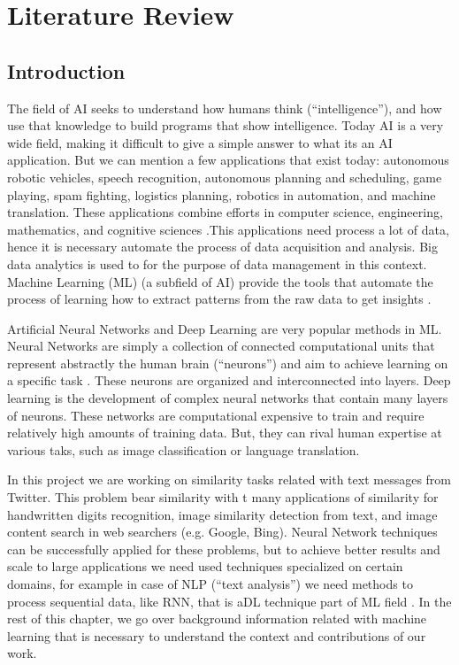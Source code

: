 \documentclass[12pt]{report}
\begin{document}
	\onehalfspacing
	
	\chapter{Literature Review} \label{chapter 2}
	\section{Introduction}
	
	The field of \ac{AI} seeks to understand how humans think (``intelligence''), and how use that knowledge to build programs that show intelligence. 
	Today \ac{AI} is a very wide field, making it difficult to give a simple answer to what its an AI application. But we can mention a few applications that exist today:  autonomous robotic vehicles, speech recognition, autonomous planning and scheduling, game playing, spam fighting, logistics planning, robotics in 
	automation, and machine translation. These applications combine efforts in computer science, engineering, mathematics, and cognitive sciences \cite{Russell2010}.This applications need process a lot of data, hence it is necessary automate the process of data acquisition and analysis. 
	Big data analytics is used to for the purpose of data management in this context.  Machine Learning (\ac{ML})  (a subfield of \ac{AI}) provide the tools  that automate the process of learning  how to extract patterns from the raw data to get insights \cite{Kelleher2015}.
	
	Artificial Neural Networks and Deep Learning are very popular methods in \ac{ML}. Neural Networks are simply a collection of connected computational 
	units that represent abstractly the human brain (“neurons”) and  aim to achieve learning on a specific task \cite{Russell2010}. These neurons are organized and interconnected into layers. Deep learning is the development of complex neural networks that contain many layers of neurons. These networks are computational expensive to train and require relatively high amounts of training data. But, they can rival human expertise at various taks, such as image classification or language translation.  
	
	In this project we are working on similarity tasks related with text messages from Twitter. This problem bear similarity with t many applications of similarity for handwritten digits recognition, image similarity detection from text, and image content search  in  web searchers (e.g. Google, Bing).  Neural Network techniques can be successfully applied for these problems, but to achieve better results and scale to large applications we need used techniques specialized on certain domains, for example in case of \ac{NLP} (``text analysis'') we need methods to process sequential data, like {RNN}, that is a{DL} technique part of {ML} field \cite{Goodfellow2016}.  In the rest of this chapter, we go over background information related with machine learning that is necessary to understand the context and contributions of our work.
	
\end{document}
